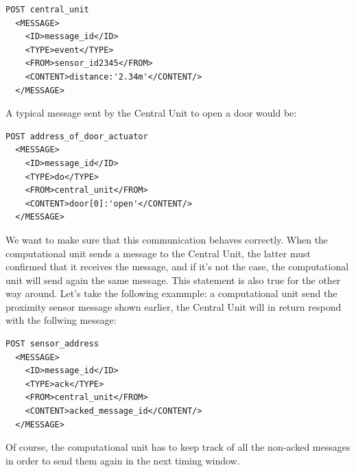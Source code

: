 \documentclass{acm_proc_article-sp}
\begin{document}
\begin{minipage}{\linewidth}
\begin{lstlisting}
POST central_unit 
  <MESSAGE>
    <ID>message_id</ID>
    <TYPE>event</TYPE>
    <FROM>sensor_id2345</FROM>
    <CONTENT>distance:'2.34m'</CONTENT/>
  </MESSAGE>
\end{lstlisting}
\end{minipage}

A typical message sent by the Central Unit to open a door would be:

\begin{minipage}{\linewidth}
\begin{lstlisting}
POST address_of_door_actuator
  <MESSAGE>
    <ID>message_id</ID>
    <TYPE>do</TYPE>
    <FROM>central_unit</FROM>
    <CONTENT>door[0]:'open'</CONTENT/>
  </MESSAGE> 
\end{lstlisting}
\end{minipage}

We want to make sure that this communication behaves correctly. 
When the computational unit sends a message to the Central Unit, the latter must confirmed that it receives the message, and if it's not the case, 
the computational unit will send again the same message. 
This statement is also true for the other way around. 
Let's take the following exammple: a computational unit send the proximity sensor message shown earlier, the Central Unit will in return respond with the follwing message:

\begin{minipage}{\linewidth}
\begin{lstlisting}
POST sensor_address
  <MESSAGE>
    <ID>message_id</ID>
    <TYPE>ack</TYPE>
    <FROM>central_unit</FROM>
    <CONTENT>acked_message_id</CONTENT/>
  </MESSAGE>
\end{lstlisting}
\end{minipage}

Of course, the computational unit has to keep track of all the non-acked messages in order to send them again in the next timing window.
\end{document}
